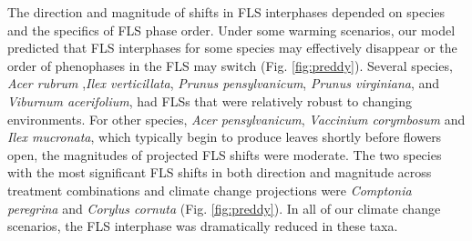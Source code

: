 \documentclass[11pt]{article}
\begin{document}
\noindent The direction and magnitude of shifts in FLS interphases depended on species and the specifics of FLS phase order. Under some warming scenarios, our model predicted that  FLS interphases for some species may effectively disappear or the order of phenophases in the FLS may switch (Fig. \ref{fig:preddy}). Several species, \textit{Acer rubrum} ,\textit{Ilex verticillata}, \textit{Prunus pensylvanicum}, \textit{Prunus virginiana}, and \textit{Viburnum acerifolium}, had FLSs that were relatively robust to changing environments. For other species, \textit{Acer pensylvanicum}, \textit{Vaccinium corymbosum} and \textit{Ilex mucronata}, which typically begin to produce leaves shortly before flowers open, the magnitudes of projected FLS shifts were moderate. The two species with the most significant FLS shifts in both direction and magnitude across treatment combinations and climate change projections were \textit{Comptonia peregrina} and \textit{Corylus cornuta} (Fig. \ref{fig:preddy}). In all of our climate change scenarios, the FLS interphase was dramatically reduced in these taxa.\\
\end{document}
